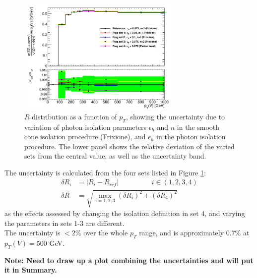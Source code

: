 \documentclass[11pt,a4paper,openright,twoside]{report}
\begin{document}
\begin{figure}[H]
\centering
	\includegraphics[width=0.7\textwidth]{frag.png}
	\caption{$R$ distribution as a function of $p_T$, showing the uncertainty due to variation of photon isolation parameters $\epsilon_h$ and $n$ in the smooth cone isolation procedure (Frixione), and $\epsilon_h$ in the photon isolation procedure. The lower panel shows the relative deviation of the varied sets from the central value, as well as the uncertainty band.}
	\label{fig:photon_frag}
\end{figure}

The uncertainty is calculated from the four sets listed in Figure \ref{fig:photon_frag}:
\begin{equation}
\begin{split}
\delta R_i &= |R_i - R_{ref}| \hspace{2cm}  i \in (1,2,3,4)\\
\delta R &= \sqrt{\max_{i=1,2,3}(\delta R_i)^2 + (\delta R_4)^2}
\end{split}
\end{equation}
as the effects assessed by changing the isolation definition in set 4, and varying the parameters in sets 1-3 are different.\\
The uncertainty is $< 2\%$ over the whole $p_T$ range, and is approximately 0.7\% at $p_T(V)=500$ GeV.

\textbf{Note: Need to draw up a plot combining the uncertainties and will put it in Summary.}
\end{document}
